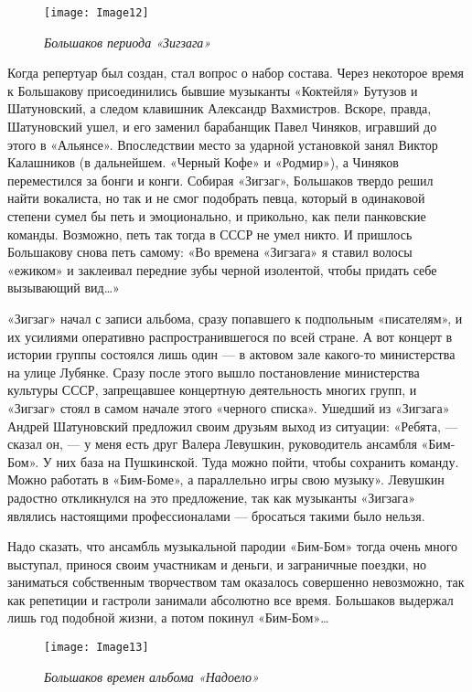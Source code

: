 \documentclass[16pt,a5paper,oneside]{book}
\begin{document}
\begin{wrapfigure}{L}{0.5\textwidth}
    \centering
    \texttt{[image: Image12]}
    \caption{\textit{Большаков периода «Зигзага»}}
\end{wrapfigure}

Когда репертуар был создан, стал вопрос о набор состава. Через некоторое время к Большакову присоединились бывшие
музыканты «Коктейля» Бутузов и Шатуновский, а следом клавишник Александр Вахмистров. Вскоре, правда, Шатуновский ушел, и
его заменил барабанщик Павел Чиняков, игравший до этого в «Альянсе». Впоследствии место за ударной установкой занял
Виктор Калашников (в дальнейшем. «Черный Кофе» и «Родмир»), а Чиняков переместился за бонги и конги. Собирая «Зигзаг»,
Большаков твердо решил найти вокалиста, но так и не смог подобрать певца, который в одинаковой степени сумел бы петь и
эмоционально, и прикольно, как пели панковские команды. Возможно, петь так тогда в СССР не умел никто. И пришлось
Большакову снова петь самому: «Во времена «Зигзага» я ставил волосы «ежиком» и заклеивал передние зубы черной изолентой,
чтобы придать себе вызывающий вид\ldots»

«Зигзаг» начал с записи альбома, сразу попавшего к подпольным «писателям», и их усилиями оперативно распространившегося
по всей стране. А вот концерт в истории группы состоялся лишь один — в актовом зале какого-то министерства на улице
Лубянке. Сразу после этого вышло постановление министерства культуры СССР, запрещавшее концертную деятельность многих
групп, и «Зигзаг» стоял в самом начале этого «черного списка». Ушедший из «Зигзага» Андрей Шатуновский предложил своим
друзьям выход из ситуации: «Ребята, — сказал он, — у меня есть друг Валера Левушкин, руководитель ансамбля «Бим-Бом». У
них база на Пушкинской. Туда можно пойти, чтобы сохранить команду. Можно работать в «Бим-Боме», а параллельно игры свою
музыку». Левушкин радостно откликнулся на это предложение, так как музыканты «Зигзага» являлись настоящими
профессионалами — бросаться такими было нельзя.

Надо сказать, что ансамбль музыкальной пародии «Бим-Бом» тогда очень много выступал, принося своим участникам и деньги,
и заграничные поездки, но заниматься собственным творчеством там оказалось совершенно невозможно, так как репетиции и
гастроли занимали абсолютно все время. Большаков выдержал лишь год подобной жизни, а потом покинул «Бим-Бом»\ldots

\begin{figure}
    \centering
    \texttt{[image: Image13]}
    \caption{\textit{Большаков времен альбома «Надоело»}}
\end{figure}
\end{document}
